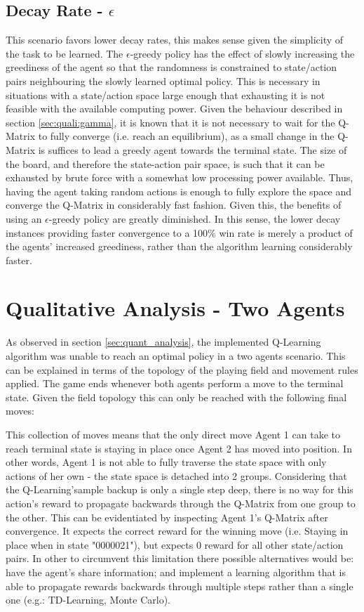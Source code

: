 \documentclass[10pt]{article}
\begin{document}
    \subsection{Decay Rate - $\epsilon$}
        This scenario favors lower decay rates, this makes sense given the simplicity of the task to be learned.
        The $\epsilon$-greedy policy has the effect of slowly increasing the greediness of the agent so that the randomness is constrained to state/action pairs neighbouring the slowly learned optimal policy. This is necessary in situations with a state/action space large enough that exhausting it is not feasible with the available computing power.
        Given the behaviour described in section \ref{sec:quali:gamma}, it is known that it is not necessary to wait for the Q-Matrix to fully converge (i.e. reach an equilibrium), as a small change in the Q-Matrix is suffices to lead a greedy agent towards the terminal state. The size of the board, and therefore the state-action pair space, is such that it can be exhausted by brute force with a somewhat low processing power available. Thus, having the agent taking random actions is enough to fully explore the space and converge the Q-Matrix in considerably fast fashion. Given this, the benefits of using an $\epsilon$-greedy policy are greatly diminished. In this sense, the lower decay instances providing faster convergence to a 100\% win rate is merely a product of the agents' increased greediness, rather than the algorithm learning considerably faster.


\section{Qualitative Analysis - Two Agents}
    As observed in section \ref{sec:quant_analysis}, the implemented Q-Learning algorithm was unable to reach an optimal policy in a two agents scenario. This can be explained in terms of the topology of the playing field and movement rules applied. The game ends whenever both agents perform a move to the terminal state. Given the field topology this can only be reached with the following final moves:


    This collection of moves means that the only direct move Agent 1 can take to reach terminal state is staying in place once Agent 2 has moved into position. In other words, Agent 1 is not able to fully traverse the state space with only actions of her own - the state space is detached into 2 groups. Considering that the Q-Learning'sample backup is only a single step deep, there is no way for this action's reward to propagate backwards through the Q-Matrix from one group to the other. This can be evidentiated by inspecting Agent 1's Q-Matrix after convergence. It expects the correct reward for the winning move (i.e. Staying in place when in state "0000021"), but expects 0 reward for all other state/action pairs. In other to circumvent this limitation there possible alternatives would be: have the agent's share information; and implement a learning algorithm that is able to propagate rewards backwards through multiple steps rather than a single one (e.g.: TD-Learning, Monte Carlo).
\end{document}
